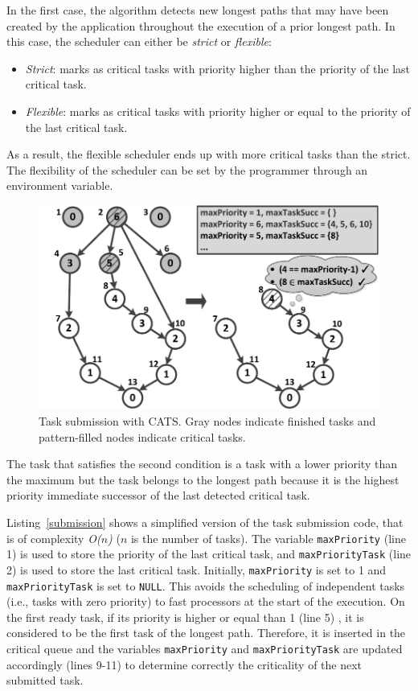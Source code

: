 In the first case, the algorithm detects new longest paths that may have been created by the application throughout the execution of a prior longest path. In this case, the scheduler can either be \textit{strict} or \textit{flexible}:
\begin{itemize}
 \item{\textit{Strict}: marks as critical tasks with priority higher than the priority of the last critical task.}
 \item{\textit{Flexible}: marks as critical tasks with priority higher or equal to the priority of the last critical task.} 
 \end{itemize}
As a result, the flexible scheduler ends up with more critical tasks than the strict. The flexibility of the scheduler can be set by the programmer through an environment variable.
\begin{figure}[tl!]
\includegraphics[width=\columnwidth]{images/fig_2.pdf} 
\centering
\caption{Task submission with CATS. Gray nodes indicate finished tasks and pattern-filled nodes indicate critical tasks.}
\label{submitFig}
\vspace{-0.5cm}
\end{figure}
The task that satisfies the second condition is a task with a lower priority than the maximum but the task belongs to the longest path because it is the highest priority immediate successor of the last detected critical task. 

Listing~\ref{submission} shows a simplified version of the task submission code, that is of complexity \textit{O($n$)} (\textit{$n$} is the number of tasks). The variable \texttt{maxPriority} (line 1) is used to store the priority of the last critical task, and \texttt{maxPriorityTask} (line 2) is used to store the last critical task. Initially, \texttt{maxPriority} is set to 1 and \texttt{maxPriorityTask} is set to \texttt{NULL}. This avoids the scheduling of independent tasks (i.e., tasks with zero priority) to fast processors at the start of the execution. On the first ready task, if its priority is higher or equal than 1 (line 5) , it is considered to be the first task of the longest path. Therefore, it is inserted in the critical queue and the variables \texttt{maxPriority} and \texttt{maxPriorityTask} are updated accordingly (lines 9-11) to determine correctly the criticality of the next submitted task.

